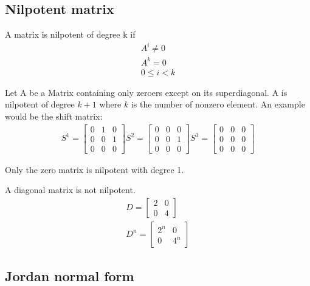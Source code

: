 \subsection{Nilpotent matrix}
A matrix is nilpotent of degree k if
\begin{gather*}
    A^i \neq 0 \\
    A^k = 0 \\
    0 \leq i < k
\end{gather*}
\begin{example}
    Let A be a Matrix containing only zeroers except on its superdiagonal. A is nilpotent of degree  \( k +1 \) where \(k\) is the number of nonzero element. An example
    would be the shift matrix:
    \begin{align*}
        S^{1} = \begin{bmatrix}
            0 & 1 & 0 \\ 0 & 0 & 1 \\ 0 & 0 & 0
        \end{bmatrix}
        S^{2} = \begin{bmatrix}
            0 & 0 & 0 \\ 0 & 0 & 1 \\ 0 & 0 & 0
        \end{bmatrix}
        S^{3} = \begin{bmatrix}
            0 & 0 & 0 \\ 0 & 0 & 0 \\ 0 & 0 & 0
        \end{bmatrix}
    \end{align*}
\end{example}
\begin{example}
    Only the zero matrix is nilpotent with degree 1.
\end{example}
\begin{example}
    A diagonal matrix is not nilpotent.
    \begin{align*}
        D = \begin{bmatrix}
            2 & 0 \\ 0 & 4
        \end{bmatrix} \\
        D^n = \begin{bmatrix}
            2^{n} & 0 \\ 0 & 4^{n}
        \end{bmatrix}
    \end{align*}
\end{example}
\subsection{Jordan normal form}
